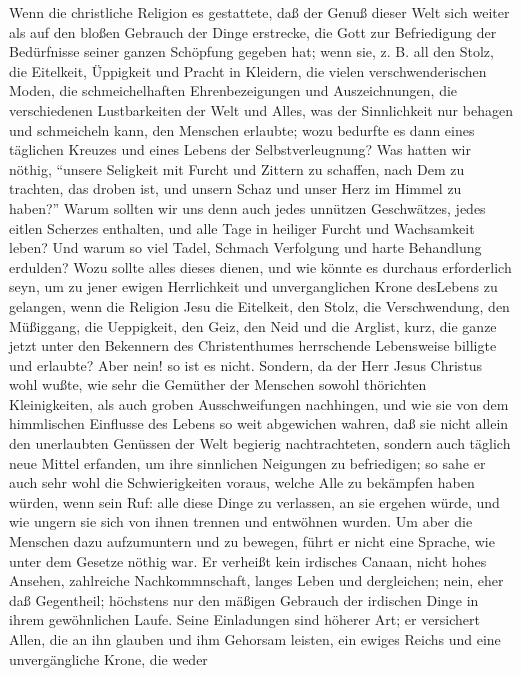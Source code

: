 \medskip

Wenn die christliche Religion es gestattete, daß der Genuß dieser Welt sich
weiter als auf den bloßen Gebrauch der Dinge erstrecke, die Gott zur
Befriedigung der Bedürfnisse seiner ganzen Schöpfung gegeben hat; wenn sie, z.
B. all den Stolz, die Eitelkeit, Üppigkeit und Pracht in Kleidern, die vielen
verschwenderischen Moden, die schmeichelhaften Ehrenbezeigungen und
Auszeichnungen, die verschiedenen Lustbarkeiten der Welt und Alles, was der
Sinnlichkeit nur behagen und schmeicheln kann, den Menschen erlaubte; wozu
bedurfte es dann eines täglichen Kreuzes und eines Lebens der Selbstverleugnung?
Was hatten wir nöthig, "`unsere Seligkeit mit Furcht und Zittern zu schaffen,
nach Dem zu trachten, das droben ist, und unsern Schaz und unser Herz im Himmel
zu haben?"' Warum sollten wir uns denn auch jedes unnützen Geschwätzes, jedes
eitlen Scherzes enthalten, und alle Tage in heiliger Furcht und Wachsamkeit
leben? Und warum so viel Tadel, Schmach Verfolgung und harte Behandlung
erdulden? Wozu sollte alles dieses dienen, und wie könnte es durchaus
erforderlich seyn, um zu jener ewigen Herrlichkeit und unverganglichen Krone
desLebens zu gelangen, wenn die Religion Jesu die Eitelkeit, den Stolz, die
Verschwendung, den Müßiggang, die Ueppigkeit, den Geiz, den Neid und die
Arglist, kurz, die ganze jetzt unter den Bekennern des Christenthumes
herrschende Lebensweise billigte und erlaubte? Aber nein! so ist es nicht.
Sondern, da der Herr Jesus Christus wohl wußte, wie sehr die Gemüther der
Menschen sowohl thörichten Kleinigkeiten, als auch groben Ausschweifungen
nachhingen, und wie sie von dem himmlischen Einflusse des Lebens so weit
abgewichen wahren, daß sie nicht allein den unerlaubten Genüssen der Welt
begierig nachtrachteten, sondern auch täglich neue Mittel erfanden, um ihre
sinnlichen Neigungen zu befriedigen; so sahe er auch sehr wohl die
Schwierigkeiten voraus, welche Alle zu bekämpfen haben würden, wenn sein Ruf:
alle diese Dinge zu verlassen, an sie ergehen würde, und wie ungern sie sich von
ihnen trennen und entwöhnen wurden. Um aber die Menschen dazu aufzumuntern und
zu bewegen, führt er nicht eine Sprache, wie unter dem Gesetze nöthig war. Er
verheißt kein irdisches Canaan, nicht hohes Ansehen, zahlreiche Nachkommnschaft,
langes Leben und dergleichen; nein, eher daß Gegentheil; höchstens nur den
mäßigen Gebrauch der irdischen Dinge in ihrem gewöhnlichen Laufe. Seine
Einladungen sind höherer Art; er versichert Allen, die an ihn glauben und ihm
Gehorsam leisten, ein ewiges Reichs und eine unvergängliche Krone, die weder
